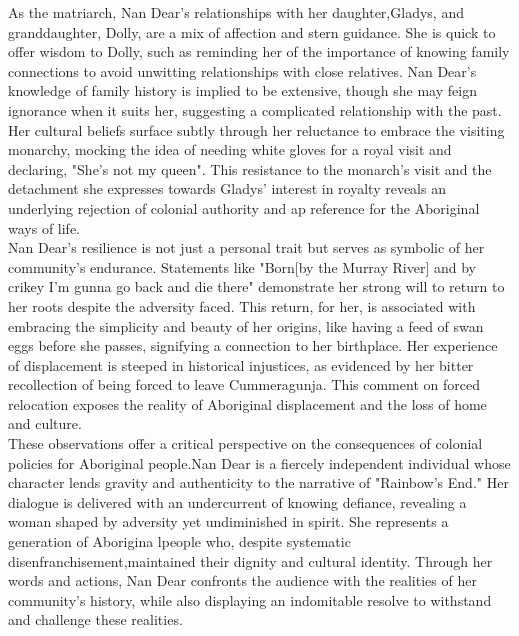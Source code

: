 \documentclass[a4paper]{article}
\begin{document}
As the matriarch, Nan Dear's relationships with her daughter,Gladys, and granddaughter, Dolly, are a mix of affection and stern guidance. She is quick to offer wisdom to Dolly, such as reminding her of the importance of knowing family connections to avoid unwitting relationships with close relatives. Nan Dear's knowledge of family history is implied to be extensive, though she may feign ignorance when it suits her, suggesting a complicated relationship with the past.\\

Her cultural beliefs surface subtly through her reluctance to embrace the visiting monarchy, mocking the idea of needing white gloves for a royal visit and declaring, "She's not my queen". This resistance to the monarch's visit and the detachment she expresses towards Gladys' interest in royalty reveals an underlying rejection of colonial authority and ap reference for the Aboriginal ways of life.\\

Nan Dear's resilience is not just a personal trait but serves as symbolic of her community's endurance. Statements like "Born[by the Murray River] and by crikey I'm gunna go back and die there" demonstrate her strong will to return to her roots despite the adversity faced. This return, for her, is associated with embracing the simplicity and beauty of her origins, like having a feed of swan eggs before she passes, signifying a connection to her birthplace. Her experience of displacement is steeped in historical injustices, as evidenced by her bitter recollection of being forced to leave Cummeragunja. This comment on forced relocation exposes the reality of Aboriginal displacement and the loss of home and culture.\\

These observations offer a critical perspective on the consequences of colonial policies for Aboriginal people.Nan Dear is a fiercely independent individual whose character lends gravity and authenticity to the narrative of "Rainbow's End." Her dialogue is delivered with an undercurrent of knowing defiance, revealing a woman shaped by adversity yet undiminished in spirit. She represents a generation of Aborigina lpeople who, despite systematic disenfranchisement,maintained their dignity and cultural identity. Through her words and actions, Nan Dear confronts the audience with the realities of her community's history, while also displaying an indomitable resolve to withstand and challenge these realities.\\
\end{document}
